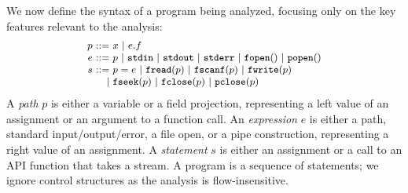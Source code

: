 We now define the syntax of a program being analyzed, focusing only on the key
features relevant to the analysis:
%
\[
  \small
  \begin{array}{@{}r@{~}r@{~}l@{}}
    p &::=& x\ |\ e.f \\
    e &::=& p\ |\ {\tt stdin}\ |\ {\tt stdout}\ |\ {\tt stderr}\ |\ {\tt fopen}()\ |\
    {\tt popen}() \\
    s &::=& p=e\ |\ {\tt fread}(p)\ |\ {\tt fscanf}(p)\ |\ {\tt fwrite}(p) \\
    &|& {\tt fseek}(p)\ |\ {\tt fclose}(p)\ |\ {\tt pclose}(p) \\
  \end{array}
\]
%
A \emph{path} $p$ is either a variable or a field projection, representing a
left value of an assignment or an argument to a function call.
%
An \emph{expression} $e$ is either a path, standard input/output/error, a file
open, or a pipe construction, representing a right value of an assignment.
%
A \emph{statement} $s$ is either an assignment or a call to an API function that
takes a stream.
%
A program is a sequence of statements;
%
we ignore control structures as the analysis is flow-insensitive.

